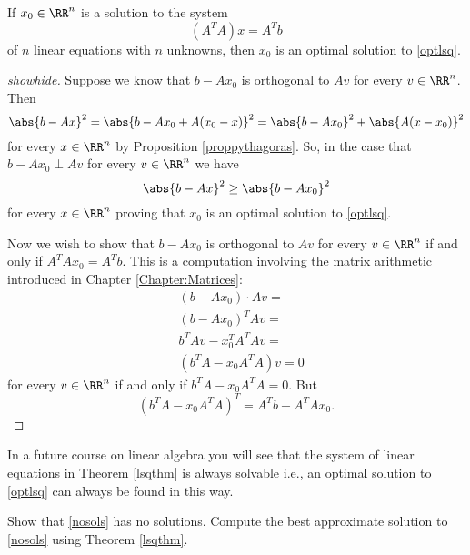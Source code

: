 \documentclass{article}
\begin{document}
\begin{theorem}[emph]\label{lsqthm}
  If $x_0\in\RR^n$ is a solution to the system
  $$
  (A^T A) x = A^T b
  $$
  of $n$ linear equations with $n$ unknowns,
  then $x_0$ is an optimal solution to \eqref{optlsq}.
\end{theorem}

  \begin{proof}[showhide]
    Suppose we know that $b - A x_0$ is orthogonal to $A v$ for every $v\in \RR^n$. Then
    $$
    \abs{b - A x}^2 = \abs{b - A x_0 + A(x_0 - x)}^2 = \abs{b - A x_0}^2 + \abs{A(x-x_0)}^2
    $$
    for every $x\in \RR^n$
    by Proposition \ref{proppythagoras}. So, in the case that
    $b - A x_0 \perp A v$ for every $v\in \RR^n$ we have
    $$
    \abs{b - A x}^2 \geq \abs{b - A x_0}^2
    $$
    for every $x\in \RR^n$ proving that $x_0$ is an optimal solution to
    \eqref{optlsq}.


    Now we wish to show that $b - A x_0$ is orthogonal to $A v$ for every $v\in \RR^n$ if and
    only if $A^T A x_0 = A^T b$. This is a computation involving the matrix arithmetic
    introduced in Chapter \ref{Chapter:Matrices}:
    \begin{align*}
      &(b - A x_0)\cdot A v = \\
      &(b - A x_0)^T A v  =\\
      &b^T A v - x_0^T A^T A v = \\
      &(b^T A - x_0 A^T A) v = 0
    \end{align*}
    for every $v\in \RR^n$ if and only if $b^T A - x_0 A^T A = 0$. But
    $$
    (b^T A - x_0 A^T A)^T = A^T b - A^T A x_0. 
    $$
  \end{proof}

In a future course on linear algebra you will see that the system of linear equations in
Theorem \ref{lsqthm} is always solvable i.e., an optimal solution to \eqref{optlsq} can
always be found in this way.



\beginshex
Show that \eqref{nosols} has no solutions. Compute the best approximate solution to \eqref{nosols} 
using Theorem \ref{lsqthm}.
\endshex
\end{document}
